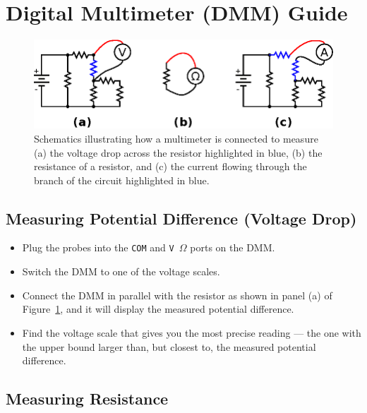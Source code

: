 \documentclass[11pt]{article}
\begin{document}
\section{Digital Multimeter (DMM) Guide}
\label{sec:dmm}

\begin{figure}[ht]
  \begin{center}
    \includegraphics{dmm.eps}
    
    \caption{Schematics illustrating how a multimeter is connected to
      measure (a) the voltage drop across the resistor highlighted in
      blue, (b) the resistance of a resistor, and (c) the current
      flowing through the branch of the circuit highlighted in blue.}
    \label{fig:dmm}
  \end{center}
\end{figure}

\subsection{Measuring Potential Difference (Voltage Drop)}

\begin{itemize}
\item Plug the probes into the \texttt{COM} and \texttt{V\,$\Omega$}
  ports on the DMM.

\item Switch the DMM to one of the voltage scales.
  
\item Connect the DMM in parallel with the resistor as shown in panel
  (a) of Figure~\ref{fig:dmm}, and it will display the measured
  potential difference.

\item Find the voltage scale that gives you the most
  precise reading --- the one with the upper bound larger than, but
  closest to, the measured potential difference.
\end{itemize}

\subsection{Measuring Resistance}
\end{document}
